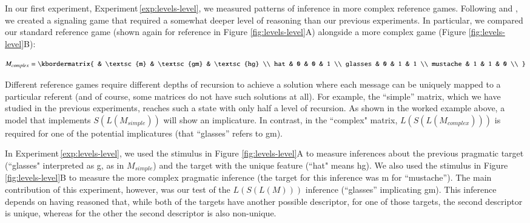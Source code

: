 \documentclass[man,noapacite]{apa2}
\newcounter{Experiment}
\newcommand{\exptref}[1]{Experiment\,\ref{#1}}
\begin{document}
In our first experiment, \exptref{exp:levels-level}, we measured patterns of inference in more complex reference games. Following  and , we created a signaling game that required a somewhat deeper level of reasoning than our previous experiments. In particular, we compared our standard reference game (shown again for reference in Figure \ref{fig:levels-level}A) alongside a more complex game (Figure \ref{fig:levels-level}B):

\begin{equation}
    M_{complex} = \kbordermatrix{
      & \textsc{m} & \textsc{gm} & \textsc{hg} \\
      hat & 0 & 0 & 1  \\
      glasses & 0 & 1 & 1 \\
      mustache & 1 & 1 & 0 \\
    }
\end{equation}

Different reference games require different depths of recursion to achieve a solution where each message can be uniquely mapped to a particular referent (and of course, some matrices do not have such solutions at all). For example, the ``simple'' matrix, which we have studied in the previous experiments, reaches such a state with only half a level of recursion. As shown in the worked example above, a model that implements $S(L(M_{simple}))$ will show an implicature. In contrast, in the ``complex" matrix, $L(S(L(M_{complex})))$ is required for one of the potential implicatures (that ``glasses'' refers to {\sc gm}).


In \exptref{exp:levels-level}, we used the stimulus in Figure \ref{fig:levels-level}A to measure inferences about the previous pragmatic target (``glasses" interpreted as {\sc g}, as in $M_{simple}$) and the target with the unique feature (``hat" means {\sc hg}). We also used the stimulus in Figure \ref{fig:levels-level}B to measure the more complex pragmatic inference (the target for this inference was {\sc m} for ``mustache''). The main contribution of this experiment, however, was our test of the $L(S(L(M)))$ inference (``glasses'' implicating {\sc gm}). This inference depends on having reasoned that, while both of the targets have another possible descriptor, for one of those targets, the second descriptor is unique, whereas for the other the second descriptor is also non-unique.
\end{document}
